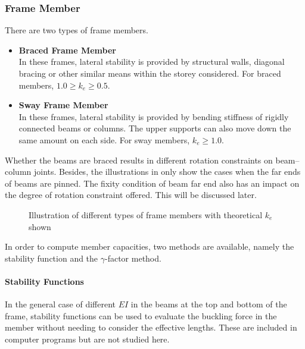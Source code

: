 \subsubsection{Frame Member}
There are two types of frame members.
\begin{itemize}
\item \textbf{Braced Frame Member}\\
In these frames, lateral stability is provided by structural walls, diagonal bracing or other similar means within the storey considered.
For braced members, $1.0\geqslant{}k_e\geqslant{}0.5$.
\item \textbf{Sway Frame Member}\\
In these frames, lateral stability is provided by bending stiffness of rigidly connected beams or columns.
The upper supports can also move down the same amount on each side.
For sway members, $k_e\geqslant{}1.0$.
\end{itemize}

Whether the beams are braced results in different rotation constraints on beam--column joints.
Besides, the illustrations in  only show the cases when the far ends of beams are pinned.
The fixity condition of beam far end also has an impact on the degree of rotation constraint offered.
This will be discussed later.
\begin{figure}[ht!]
\centering

\caption{Illustration of different types of frame members with theoretical $k_e$ shown}\label{fig:fm}
\end{figure}

In order to compute member capacities, two methods are available, namely the stability function and the $\gamma$-factor method.
\paragraph{Stability Functions}
In the general case of different $EI$ in the beams at the top and bottom of the frame, stability functions can be used to evaluate the buckling force in the member without needing to consider the effective lengths.
These are included in computer programs but are not studied here.
